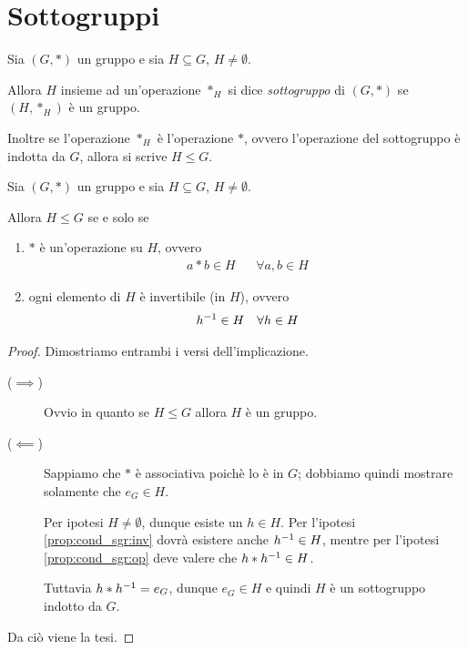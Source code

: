 \section{Sottogruppi}

\begin{definition}[Sottogruppo]\label{def:sottogruppo}
    Sia $(G, *)$ un gruppo e sia $H \subseteq G$, $H \neq \emptyset$.
    
    Allora $H$ insieme ad un'operazione $*_H$ si dice \emph{sottogruppo} di $(G, *)$ se $(H, *_H)$ è un gruppo.

    Inoltre se l'operazione $*_H$ è l'operazione $*$, ovvero l'operazione del sottogruppo è indotta da $G$, allora si scrive $H \leq G$.
\end{definition}

\begin{proposition}\label{prop:cond_sgr}
    Sia $(G, *)$ un gruppo e sia $H \subseteq G$, $H \neq \emptyset$.

    Allora $H \leq G$ se e solo se \begin{enumerate}[label={(\roman*)}, ref={\theproposition: (\roman*)}]
        \item \label{prop:cond_sgr:op} $*$ è un'operazione su $H$, ovvero \begin{align*}
            a*b \in H &&\forall a, b \in H
        \end{align*}
        \item \label{prop:cond_sgr:inv} ogni elemento di $H$ è invertibile (in $H$), ovvero \begin{align*}
            h^{-1} \in H &&\forall h \in H
        \end{align*}
    \end{enumerate}
\end{proposition}
\begin{proof}
    Dimostriamo entrambi i versi dell'implicazione.
    \begin{description}
        \item[($\implies$)] Ovvio in quanto se $H \leq G$ allora $H$ è un gruppo.
        \item[($\impliedby$)] Sappiamo che $*$ è associativa poichè lo è in $G$; dobbiamo quindi mostrare solamente che $e_G \in H$.
        
        Per ipotesi $H \neq \emptyset$, dunque esiste un $h \in H$. Per l'ipotesi \ref{prop:cond_sgr:inv} dovrà esistere anche $h^{-1} \in H$, mentre per l'ipotesi \ref{prop:cond_sgr:op} deve valere che $h * h^{-1} \in H$. 

        Tuttavia $h * h^{-1} = e_G$, dunque $e_G \in H$ e quindi $H$ è un sottogruppo indotto da $G$. 
    \end{description}

    Da ciò viene la tesi.
\end{proof}

